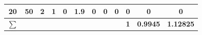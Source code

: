 \begin{table}[htbp]
{\begin{tabular}{cccccccccccc}
            20                                  & 50             & 2                 & 1                 & 0                   & 1.9                       & 0            & 0                        & 0                          & 0                            & 0                                   & 0                                     \\ \midrule
            \rowcolor{green!15} \textbf{$\sum$} &                &                   &                   &                     &                           &              &                          &                            & \textbf{1}                   & \textbf{0.9945}                     & \textbf{1.12825}                      \\ \bottomrule
        \end{tabular}
    }
\end{table}

